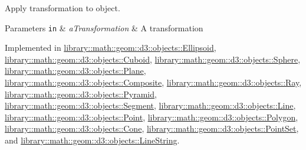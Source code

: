 Apply transformation to object. 


\begin{DoxyParams}[1]{Parameters}
\mbox{\tt in}  & {\em a\+Transformation} & A transformation \\
\hline
\end{DoxyParams}


Implemented in \hyperlink{classlibrary_1_1math_1_1geom_1_1d3_1_1objects_1_1_ellipsoid_a101408b676b518c0270ebabc55f288d2}{library\+::math\+::geom\+::d3\+::objects\+::\+Ellipsoid}, \hyperlink{classlibrary_1_1math_1_1geom_1_1d3_1_1objects_1_1_cuboid_a97a3057434b7c90891a5bdb1cd4b907c}{library\+::math\+::geom\+::d3\+::objects\+::\+Cuboid}, \hyperlink{classlibrary_1_1math_1_1geom_1_1d3_1_1objects_1_1_sphere_acb4ca3f037791f9f71bffc904a1bf961}{library\+::math\+::geom\+::d3\+::objects\+::\+Sphere}, \hyperlink{classlibrary_1_1math_1_1geom_1_1d3_1_1objects_1_1_plane_ab3474aef2e9f8dd4f9e86da017522487}{library\+::math\+::geom\+::d3\+::objects\+::\+Plane}, \hyperlink{classlibrary_1_1math_1_1geom_1_1d3_1_1objects_1_1_composite_a607850ccaeaea1dcd0cc57f986bea243}{library\+::math\+::geom\+::d3\+::objects\+::\+Composite}, \hyperlink{classlibrary_1_1math_1_1geom_1_1d3_1_1objects_1_1_ray_a0dd177a924978e1817a9fa888594e694}{library\+::math\+::geom\+::d3\+::objects\+::\+Ray}, \hyperlink{classlibrary_1_1math_1_1geom_1_1d3_1_1objects_1_1_pyramid_a79d9b11e42c47213e2eb9538e52a2103}{library\+::math\+::geom\+::d3\+::objects\+::\+Pyramid}, \hyperlink{classlibrary_1_1math_1_1geom_1_1d3_1_1objects_1_1_segment_a63c7017391bcc0e67f4d97311e7ebdb2}{library\+::math\+::geom\+::d3\+::objects\+::\+Segment}, \hyperlink{classlibrary_1_1math_1_1geom_1_1d3_1_1objects_1_1_line_ae485ab541cbd10113eac30d1956fb4c0}{library\+::math\+::geom\+::d3\+::objects\+::\+Line}, \hyperlink{classlibrary_1_1math_1_1geom_1_1d3_1_1objects_1_1_point_ad2052f6ef5df88b75cae09c58a678f95}{library\+::math\+::geom\+::d3\+::objects\+::\+Point}, \hyperlink{classlibrary_1_1math_1_1geom_1_1d3_1_1objects_1_1_polygon_a712a6f0b739c0f92f3c64873482da217}{library\+::math\+::geom\+::d3\+::objects\+::\+Polygon}, \hyperlink{classlibrary_1_1math_1_1geom_1_1d3_1_1objects_1_1_cone_a838ecaabc29abd32666342a7582a4a3e}{library\+::math\+::geom\+::d3\+::objects\+::\+Cone}, \hyperlink{classlibrary_1_1math_1_1geom_1_1d3_1_1objects_1_1_point_set_aa747a6169cd9c14011c8249a728c3c48}{library\+::math\+::geom\+::d3\+::objects\+::\+Point\+Set}, and \hyperlink{classlibrary_1_1math_1_1geom_1_1d3_1_1objects_1_1_line_string_a8a20f45b2af9cc45dbf7aff9e5d4824e}{library\+::math\+::geom\+::d3\+::objects\+::\+Line\+String}.

